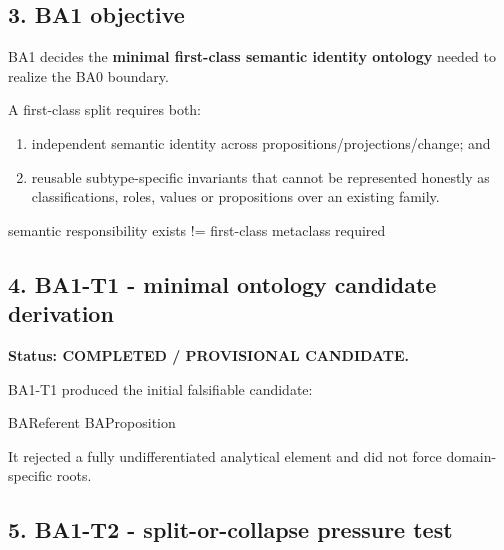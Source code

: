 \documentclass[
  10pt,
]{article}
\newenvironment{Shaded}{}{}
\newcommand{\NormalTok}[1]{#1}
\providecommand{\tightlist}{%
  \setlength{\itemsep}{0pt}\setlength{\parskip}{0pt}}
\begin{document}
\subsection{3. BA1 objective}\label{ba1-objective}

BA1 decides the \textbf{minimal first-class semantic identity ontology}
needed to realize the BA0 boundary.

A first-class split requires both:

\begin{enumerate}
\def\labelenumi{\arabic{enumi}.}
\tightlist
\item
  independent semantic identity across propositions/projections/change;
  and
\item
  reusable subtype-specific invariants that cannot be represented
  honestly as classifications, roles, values or propositions over an
  existing family.
\end{enumerate}

\begin{Shaded}
\begin{Highlighting}[]
\NormalTok{semantic responsibility exists}
\NormalTok{        !=}
\NormalTok{first{-}class metaclass required}
\end{Highlighting}
\end{Shaded}

\subsection{4. BA1-T1 - minimal ontology candidate
derivation}\label{ba1-t1---minimal-ontology-candidate-derivation}

\textbf{Status: COMPLETED / PROVISIONAL CANDIDATE.}

BA1-T1 produced the initial falsifiable candidate:

\begin{Shaded}
\begin{Highlighting}[]
\NormalTok{BAReferent}
\NormalTok{BAProposition}
\end{Highlighting}
\end{Shaded}

It rejected a fully undifferentiated analytical element and did not
force domain-specific roots.

\subsection{5. BA1-T2 - split-or-collapse pressure
test}\label{ba1-t2---split-or-collapse-pressure-test}
\end{document}
